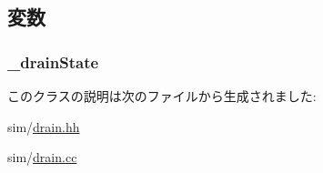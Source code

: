 \subsection{変数}
\hypertarget{classDrainable_a5aef2a2eb3b798eb214b1e83d6f75275}{
\subsubsection[{\_\-drainState}]{ {\bf \_\-drainState}}}
\label{classDrainable_a5aef2a2eb3b798eb214b1e83d6f75275}


このクラスの説明は次のファイルから生成されました:\begin{DoxyCompactItemize}
\item 
sim/\hyperlink{drain_8hh}{drain.hh}\item 
sim/\hyperlink{drain_8cc}{drain.cc}\end{DoxyCompactItemize}
